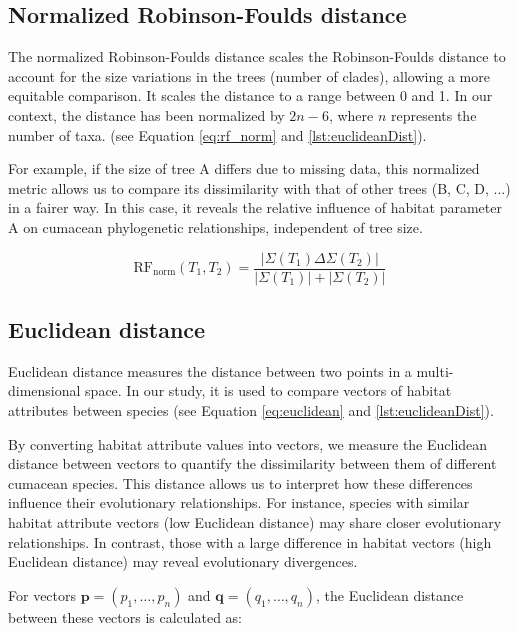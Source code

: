 \subsection{Normalized Robinson-Foulds distance}\label{RFnorm}

The normalized Robinson-Foulds distance scales the Robinson-Foulds distance to account for the size variations in the trees (number of clades), allowing a more equitable comparison. It scales the distance to a range between 0 and 1. In our context, the distance has been normalized by $2n-6$, where $n$ represents the number of taxa. (see Equation \eqref{eq:rf_norm} and \autoref{lst:euclideanDist}).

For example, if the size of tree A differs due to missing data, this normalized metric allows us to compare its dissimilarity with that of other trees (B, C, D, ...) in a fairer way. In this case, it reveals the relative influence of habitat parameter A on cumacean phylogenetic relationships, independent of tree size.

\begin{equation}\label{eq:rf_norm}
    \text{RF}_{\text{norm}}(T_1, T_2) = \frac{| \Sigma(T_1) \Delta \Sigma(T_2) |}{| \Sigma(T_1) | + | \Sigma(T_2) |}
\end{equation}

\subsection{Euclidean distance}\label{euclidean}

Euclidean distance measures the distance between two points in a multi-dimensional space. In our study, it is used to compare vectors of habitat attributes between species (see Equation \eqref{eq:euclidean} and \autoref{lst:euclideanDist}).

By converting habitat attribute values into vectors, we measure the Euclidean distance between vectors to quantify the dissimilarity between them of different cumacean species. This distance allows us to interpret how these differences influence their evolutionary relationships. For instance, species with similar habitat attribute vectors (low Euclidean distance) may share closer evolutionary relationships. In contrast, those with a large difference in habitat vectors (high Euclidean distance) may reveal evolutionary divergences.

For vectors $\mathbf{p} = (p_1, \ldots, p_n)$ and $\mathbf{q} = (q_1, \ldots, q_n)$, the Euclidean distance between these vectors is calculated as:

